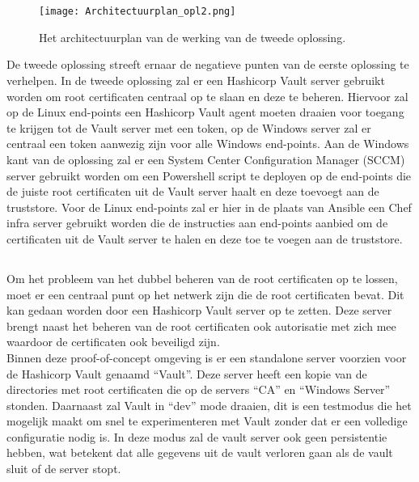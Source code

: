 \pagebreak

\section{}%
\label{sec:Tweede_oplossing}

\begin{figure}[H]
  \centering
  \texttt{[image: Architectuurplan\_opl2.png]}
  \caption[Architectuurplan van de tweede oplossing]{\label{fig:opl2} Het architectuurplan van de werking van de tweede oplossing.}
\end{figure}

De tweede oplossing streeft ernaar de negatieve punten van de eerste oplossing te verhelpen. In de tweede oplossing zal er een Hashicorp Vault server gebruikt worden om root certificaten centraal op te slaan en deze te beheren. 
Hiervoor zal op de Linux end-points een Hashicorp Vault agent moeten draaien voor toegang te krijgen tot de Vault server met een token, op de Windows server zal er centraal een token aanwezig zijn voor alle Windows end-points.
Aan de Windows kant van de oplossing zal er een System Center Configuration Manager (SCCM) server gebruikt worden om een Powershell script te deployen op de end-points die de juiste root certificaten uit de Vault server haalt en deze toevoegt aan de truststore.
Voor de Linux end-points zal er hier in de plaats van Ansible een Chef infra server gebruikt worden die de instructies aan end-points aanbied om de certificaten uit de Vault server te halen en deze toe te voegen aan de truststore.

\subsection{}
\label{subsec:Installeren_van_een_Vault_server}

Om het probleem van het dubbel beheren van de root certificaten op te lossen, moet er een centraal punt op het netwerk zijn die de root certificaten bevat. Dit kan gedaan worden door een Hashicorp Vault server op te zetten. Deze server brengt naast het beheren van de root certificaten ook autorisatie met zich mee waardoor de certificaten ook beveiligd zijn.\\
Binnen deze proof-of-concept omgeving is er een standalone server voorzien voor de Hashicorp Vault genaamd ``Vault''. 
Deze server heeft een kopie van de directories met root certificaten die op de servers ``CA'' en ``Windows Server'' stonden. Daarnaast zal Vault in ``dev'' mode draaien, dit is een testmodus die het mogelijk maakt om snel te experimenteren met Vault zonder dat er een volledige configuratie nodig is. 
In deze modus zal de vault server ook geen persistentie hebben, wat betekent dat alle gegevens uit de vault verloren gaan als de vault sluit of de server stopt.


